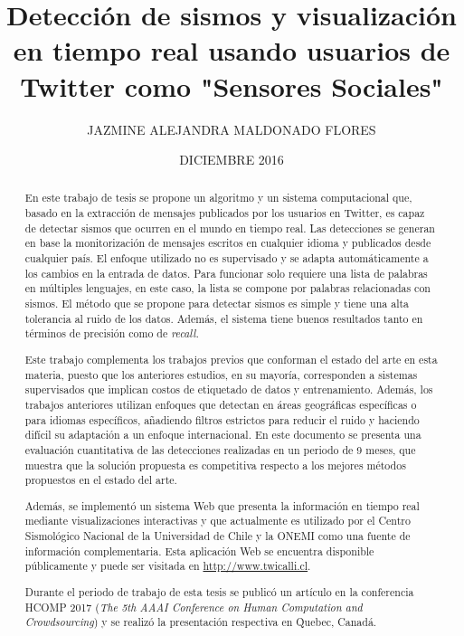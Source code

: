\documentclass[upright, contnum]{umemoria}
\author{JAZMINE ALEJANDRA MALDONADO FLORES}
\title{Detección de sismos y visualización en tiempo real usando usuarios de Twitter como "Sensores Sociales"}
\date{DICIEMBRE 2016}
\begin{document}
\frontmatter
\maketitle

\begin{abstract}
En este trabajo de tesis se propone un algoritmo y un sistema computacional que, basado en la extracción de mensajes publicados por los usuarios en Twitter, es capaz de detectar sismos que ocurren en el mundo en tiempo real. Las detecciones se generan en base la monitorización de mensajes escritos en cualquier idioma y publicados desde cualquier país. El enfoque utilizado no es supervisado y se adapta automáticamente a los cambios en la entrada de datos. Para funcionar solo requiere una lista de palabras en múltiples lenguajes, en este caso, la lista se compone por palabras relacionadas con sismos. 
El método que se propone para detectar sismos es simple y tiene una alta tolerancia al ruido de los datos.  Además, el sistema tiene buenos resultados tanto en términos de precisión como de \textit{recall.} 

Este trabajo complementa los trabajos previos que conforman el estado del arte en esta materia, puesto que los anteriores estudios, en su mayoría, corresponden a sistemas supervisados que implican costos de etiquetado de datos y entrenamiento. Además, los trabajos anteriores utilizan enfoques que detectan en áreas geográficas específicas o para idiomas específicos, añadiendo filtros estrictos para reducir el ruido y haciendo difícil su adaptación a un enfoque internacional. En este documento se presenta una evaluación cuantitativa de las detecciones realizadas en un periodo de 9 meses, que muestra que la solución propuesta es competitiva respecto a los mejores métodos propuestos en el estado del arte. 

Además, se implementó un sistema Web que presenta la información en tiempo real mediante visualizaciones interactivas y que actualmente es utilizado por el Centro Sismológico Nacional de la Universidad de Chile y la ONEMI como una fuente de información complementaria. Esta aplicación Web se encuentra disponible públicamente y puede ser visitada en \url{http://www.twicalli.cl}.

Durante el periodo de trabajo de esta tesis se publicó un artículo en la conferencia HCOMP 2017 (\textit{The 5th AAAI Conference on Human Computation and Crowdsourcing}) y se realizó la presentación respectiva en Quebec, Canadá.  

\end{abstract}
\end{document}
